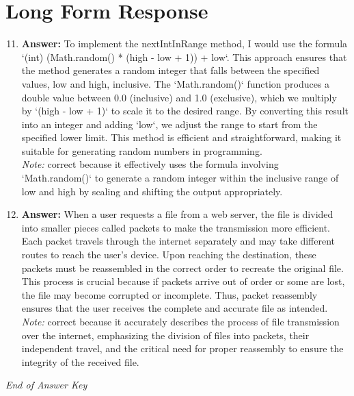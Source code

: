 \documentclass[12pt]{article}
\begin{document}
\section*{Long Form Response}
\begin{enumerate}[label=\arabic*.]
\setcounter{enumi}{10}
\item \textbf{Answer:} To implement the nextIntInRange method, I would use the formula `(int) (Math.random() * (high - low + 1)) + low`. This approach ensures that the method generates a random integer that falls between the specified values, low and high, inclusive. The `Math.random()` function produces a double value between 0.0 (inclusive) and 1.0 (exclusive), which we multiply by `(high - low + 1)` to scale it to the desired range. By converting this result into an integer and adding `low`, we adjust the range to start from the specified lower limit. This method is efficient and straightforward, making it suitable for generating random numbers in programming.
\\ \textit{Note:} correct because it effectively uses the formula involving `Math.random()` to generate a random integer within the inclusive range of low and high by scaling and shifting the output appropriately.
\item \textbf{Answer:} When a user requests a file from a web server, the file is divided into smaller pieces called packets to make the transmission more efficient. Each packet travels through the internet separately and may take different routes to reach the user's device. Upon reaching the destination, these packets must be reassembled in the correct order to recreate the original file. This process is crucial because if packets arrive out of order or some are lost, the file may become corrupted or incomplete. Thus, packet reassembly ensures that the user receives the complete and accurate file as intended.
\\ \textit{Note:} correct because it accurately describes the process of file transmission over the internet, emphasizing the division of files into packets, their independent travel, and the critical need for proper reassembly to ensure the integrity of the received file.
\end{enumerate}

\vfill
\noindent\textit{End of Answer Key}
\end{document}
